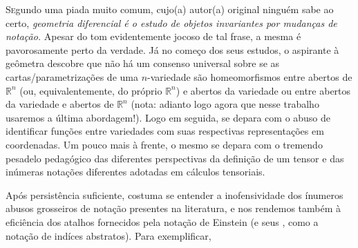 \PlaceText{69mm}{35mm}{ \color{gal}\noindent\makebox[\linewidth]{\rule{2\paperwidth}{1pt}}}

\PlaceText{69mm}{63mm}{ \color{gal}\noindent\makebox[\linewidth]{\rule{2\paperwidth}{1pt}}}

\PlaceText{15mm}{12mm}{ \color{white}\noindent\makebox[\linewidth]{\rule{2\paperwidth}{10pt}}}


\color{black}


\lettrine[nindent=2em,lines=1]{S}egundo uma piada muito comum, cujo(a) autor(a) original ninguém sabe ao certo, \emph{geometria diferencial é o estudo de objetos invariantes por mudanças de notação.} Apesar do tom evidentemente jocoso de tal frase, a mesma é pavorosamente perto da verdade. Já no começo dos seus estudos, o aspirante à geômetra descobre que não há um consenso universal sobre se as cartas/parametrizações de uma $n$-variedade são homeomorfismos entre abertos de $\mathbb{R}^n$ (ou, equivalentemente, do próprio $\mathbb{R}^n$) e abertos da variedade ou entre abertos da variedade e abertos de $\mathbb{R}^n$ (nota: adianto logo agora que nesse trabalho usaremos a última abordagem!). Logo em seguida, se depara com o abuso de identificar funções entre variedades com suas respectivas representações em coordenadas. Um pouco mais à frente, o mesmo se depara com o tremendo pesadelo pedagógico das diferentes perspectivas da definição de um tensor e das inúmeras notações diferentes adotadas em cálculos tensoriais.  \par 
Após persistência suficiente, costuma se entender a inofensividade dos ínumeros abusos grosseiros de notação presentes na literatura, e nos rendemos também à eficiência dos atalhos fornecidos pela notação de Einstein (e seus , como a notação de indíces abstratos). Para exemplificar, 
